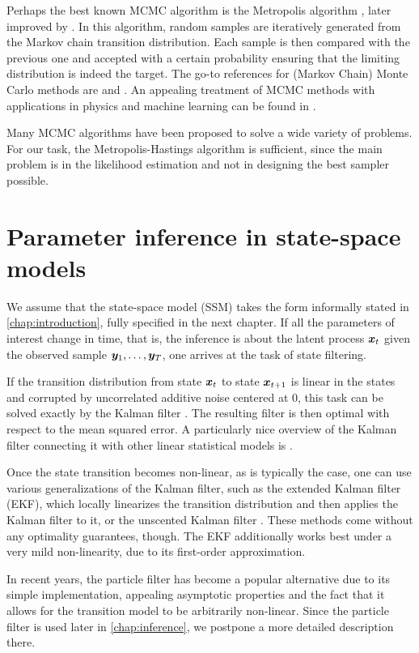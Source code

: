 Perhaps the best known MCMC algorithm is the Metropolis algorithm \citep{metropolis}, later improved by \cite{hastings}. In this algorithm, random samples are iteratively generated from the Markov chain transition distribution. Each sample is then compared with the previous one and accepted with a certain probability ensuring that the limiting distribution is indeed the target. The go-to references for (Markov Chain) Monte Carlo methods are \cite{robert-casella} and \cite{mcmc}. An appealing treatment of MCMC methods with applications in physics and machine learning can be found in \cite{information-theory}.

Many MCMC algorithms have been proposed to solve a wide variety of problems. For our task, the Metropolis-Hastings algorithm is sufficient, since the main problem is in the likelihood estimation and not in designing the best sampler possible.

\section{Parameter inference in state-space models}
We assume that the state-space model (SSM) takes the form informally stated in \autoref{chap:introduction}, fully specified in the next chapter. If all the parameters of interest change in time, that is, the inference is about the latent process $\bm{x}_t$ given the observed sample $\bm{y}_1, \ldots, \bm{y}_T$, one arrives at the task of state filtering.

If the transition distribution from state $\bm{x}_t$ to state $\bm{x}_{t+1}$ is linear in the states and corrupted by uncorrelated additive noise centered at 0, this task can be solved exactly by the Kalman filter \citep{kalman}. The resulting filter is then optimal with respect to the mean squared error. A particularly nice overview of the Kalman filter connecting it with other linear statistical models is \cite{lds}.

Once the state transition becomes non-linear, as is typically the case, one can use various generalizations of the Kalman filter, such as the extended Kalman filter (EKF), which locally linearizes the transition distribution and then applies the Kalman filter to it, or the unscented Kalman filter \citep{ukf}. These methods come without any optimality guarantees, though. The EKF additionally works best under a very mild non-linearity, due to its first-order approximation.

In recent years, the particle filter \citep{particle-filter} has become a popular alternative due to its simple implementation, appealing asymptotic properties and the fact that it allows for the transition model to be arbitrarily non-linear. Since the particle filter is used later in \autoref{chap:inference}, we postpone a more detailed description there.


